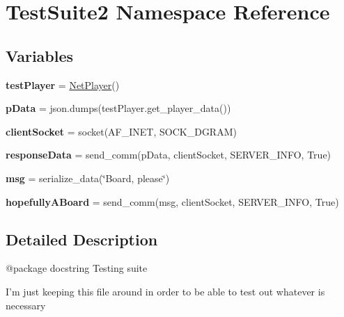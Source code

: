 \hypertarget{namespace_test_suite2}{}\section{Test\+Suite2 Namespace Reference}
\label{namespace_test_suite2}
\subsection*{Variables}
\begin{DoxyCompactItemize}
\item 
\mbox{\label{namespace_test_suite2_ae69e69382f847164d52ac118380e6bbf}} 
{\bfseries test\+Player} = \hyperlink{class_net_player_1_1_net_player}{Net\+Player}()
\item 
\mbox{\label{namespace_test_suite2_adfc61f9442f7f6f7ae2be2e1d19f15a6}} 
{\bfseries p\+Data} = json.\+dumps(test\+Player.\+get\+\_\+player\+\_\+data())
\item 
\mbox{\label{namespace_test_suite2_a40fae115ab8d77061b186a8bdecc3c6e}} 
{\bfseries client\+Socket} = socket(A\+F\+\_\+\+I\+N\+ET, S\+O\+C\+K\+\_\+\+D\+G\+R\+AM)
\item 
\mbox{\label{namespace_test_suite2_a4884a25b5285bdc1bb063623171e8e6b}} 
{\bfseries response\+Data} = send\+\_\+comm(p\+Data, client\+Socket, S\+E\+R\+V\+E\+R\+\_\+\+I\+N\+FO, True)
\item 
\mbox{\label{namespace_test_suite2_a98423768171d476666ea33e41ae06514}} 
{\bfseries msg} = serialize\+\_\+data(\char`\"{}Board, please\char`\"{})
\item 
\mbox{\label{namespace_test_suite2_a3f0603df36ca4a6d93193d786c1be3bb}} 
{\bfseries hopefully\+A\+Board} = send\+\_\+comm(msg, client\+Socket, S\+E\+R\+V\+E\+R\+\_\+\+I\+N\+FO, True)
\end{DoxyCompactItemize}


\subsection{Detailed Description}
\begin{DoxyVerb}@package docstring
Testing suite

I'm just keeping this file around in order to be able to test out whatever
is necessary
\end{DoxyVerb}
 